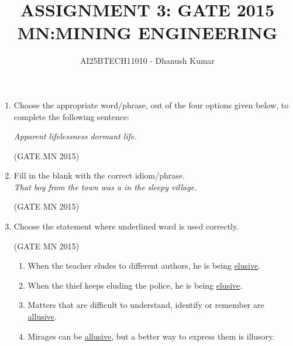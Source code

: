 \documentclass[journal]{IEEEtran}
\begin{document}
\title{
ASSIGNMENT 3: GATE 2015 \\
MN:MINING ENGINEERING}
\author{AI25BTECH11010 - Dhanush Kumar}
\maketitle
\renewcommand{\thefigure}{\theenumi}
\renewcommand{\thetable}{\theenumi}

\begin{enumerate}

\item Choose the appropriate word/phrase, out of the four options given below, to complete the following sentence:


\noindent \textit{Apparent lifelessness \underline{\hspace{2cm}} dormant life.}

\hfill(GATE MN 2015)

\begin{enumerate}
\end{enumerate}


\item Fill in the blank with the correct idiom/phrase.\\


\noindent \textit{That boy from the town was a \underline{\hspace{2cm}} in the sleepy village.}

\hfill(GATE MN 2015)

\begin{enumerate}
\end{enumerate}


\item Choose the statement where underlined word is used correctly.


	\hfill(GATE MN 2015)
\begin{enumerate}
    \item When the teacher eludes to different authors, he is being \uline{elusive}.
    \item When the thief keeps eluding the police, he is being \uline{elusive}.
    \item Matters that are difficult to understand, identify or remember are \uline{allusive}.
    \item Mirages can be \uline{allusive}, but a better way to express them is illusory.
\end{enumerate}



\end{enumerate}
\end{document}
